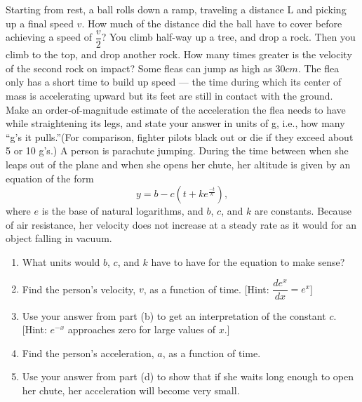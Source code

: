 \documentclass[12pt,addpoints]{exam}
\begin{document}
\begin{center}
\begin{questions}
\begin{center}
			\end{center}\vspace{1in}
			\question Starting from rest, a ball rolls down a ramp, traveling a distance L and picking up a final speed $v$. How much of the distance did the ball have to cover before achieving a speed of $\dfrac{v}{2}$?\vspace{1in}
			\question You climb half-way up a tree, and drop a rock. Then you climb to the top, and drop another rock. How many times greater is the velocity of the second rock on impact?\vspace{1in}
			\question Some fleas can jump as high as $30 cm$. The flea only has a short time to build up speed — the time during which its center of mass is accelerating upward but its feet are still in contact with the ground. Make an order-of-magnitude estimate of the acceleration the flea needs to have while straightening its legs, and state your answer in units of g, i.e., how many “g’s it pulls.”(For comparison, fighter pilots black out or die
			if they exceed about 5 or 10 g’s.)\vspace{1in}
			\question A person is parachute jumping. During the time between when she leaps out of the plane and when she opens her chute, her altitude is given by an equation of the form
			$$y=b-c(t+ke^{\frac{-t}{k}}),$$
			where $e$ is the base of natural logarithms, and $b$, $c$, and $k$ are constants. Because of air resistance, her velocity does not increase at a steady rate as it would for an object falling in vacuum.
			\begin{enumerate}[label=(\alph*)]
				\item What units would $b$, $c$, and $k$ have to have for the equation to make sense?\vspace{1in}
				\item Find the person’s velocity, $v$, as a function of time. [Hint: $\dfrac{d e^x}{dx}=e^x$]\vspace{1in}
				\item Use your answer from part (b) to get an interpretation of the constant $c$. [Hint: $e^{-x}$ approaches zero for large values of $x$.]\vspace{1in}
				\item Find the person’s acceleration, $a$, as a function of time.\vspace{1in}
				\item Use your answer from part (d) to show that if she waits long enough to open her chute, her acceleration will become very small.\vspace{1in} 

\end{enumerate}
\end{questions}
\end{center}
\end{document}

